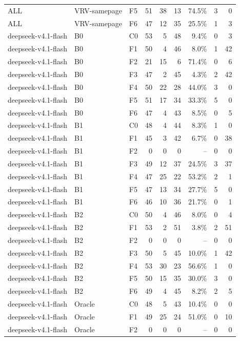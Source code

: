 \begin{tabular}{lllrrrrrr}
ALL & VRV-samepage & F5 & 51 & 38 & 13 & 74.5\% & 3 & 0 \\
ALL & VRV-samepage & F6 & 47 & 12 & 35 & 25.5\% & 1 & 3 \\
deepseek-v4.1-flash & B0 & C0 & 53 & 5 & 48 & 9.4\% & 0 & 3 \\
deepseek-v4.1-flash & B0 & F1 & 50 & 4 & 46 & 8.0\% & 1 & 42 \\
deepseek-v4.1-flash & B0 & F2 & 21 & 15 & 6 & 71.4\% & 0 & 6 \\
deepseek-v4.1-flash & B0 & F3 & 47 & 2 & 45 & 4.3\% & 2 & 42 \\
deepseek-v4.1-flash & B0 & F4 & 50 & 22 & 28 & 44.0\% & 3 & 0 \\
deepseek-v4.1-flash & B0 & F5 & 51 & 17 & 34 & 33.3\% & 5 & 0 \\
deepseek-v4.1-flash & B0 & F6 & 47 & 4 & 43 & 8.5\% & 0 & 5 \\
deepseek-v4.1-flash & B1 & C0 & 48 & 4 & 44 & 8.3\% & 1 & 0 \\
deepseek-v4.1-flash & B1 & F1 & 45 & 3 & 42 & 6.7\% & 0 & 38 \\
deepseek-v4.1-flash & B1 & F2 & 0 & 0 & 0 & -- & 0 & 0 \\
deepseek-v4.1-flash & B1 & F3 & 49 & 12 & 37 & 24.5\% & 3 & 37 \\
deepseek-v4.1-flash & B1 & F4 & 47 & 25 & 22 & 53.2\% & 2 & 1 \\
deepseek-v4.1-flash & B1 & F5 & 47 & 13 & 34 & 27.7\% & 5 & 0 \\
deepseek-v4.1-flash & B1 & F6 & 46 & 10 & 36 & 21.7\% & 0 & 1 \\
deepseek-v4.1-flash & B2 & C0 & 50 & 4 & 46 & 8.0\% & 0 & 4 \\
deepseek-v4.1-flash & B2 & F1 & 53 & 2 & 51 & 3.8\% & 2 & 51 \\
deepseek-v4.1-flash & B2 & F2 & 0 & 0 & 0 & -- & 0 & 0 \\
deepseek-v4.1-flash & B2 & F3 & 50 & 5 & 45 & 10.0\% & 1 & 42 \\
deepseek-v4.1-flash & B2 & F4 & 53 & 30 & 23 & 56.6\% & 1 & 0 \\
deepseek-v4.1-flash & B2 & F5 & 50 & 15 & 35 & 30.0\% & 3 & 0 \\
deepseek-v4.1-flash & B2 & F6 & 49 & 4 & 45 & 8.2\% & 2 & 5 \\
deepseek-v4.1-flash & Oracle & C0 & 48 & 5 & 43 & 10.4\% & 0 & 0 \\
deepseek-v4.1-flash & Oracle & F1 & 49 & 25 & 24 & 51.0\% & 0 & 10 \\
deepseek-v4.1-flash & Oracle & F2 & 0 & 0 & 0 & -- & 0 & 0 \\

\end{tabular}
